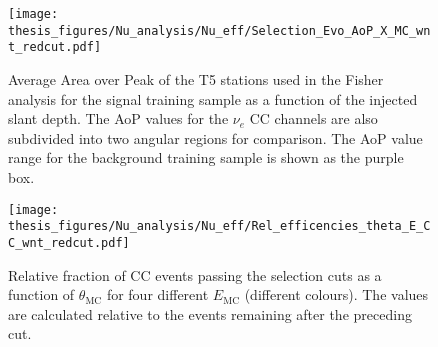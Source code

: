 \begin{figure}[t!]
  \centering
  \texttt{[image: thesis\_figures/Nu\_analysis/Nu\_eff/Selection\_Evo\_AoP\_X\_MC\_wnt\_redcut.pdf]}
  \caption{Average Area over Peak of the T5 stations used in the Fisher analysis for the signal training sample as a function of the injected slant depth. The AoP values for the $\nu_e$ CC channels are also subdivided into two angular regions for comparison. The AoP value range for the background training sample is shown as the purple box.}
  \label{fig:AoP_v_X}
\end{figure}

\begin{figure}[ht!]
  \centering
  \texttt{[image: thesis\_figures/Nu\_analysis/Nu\_eff/Rel\_efficencies\_theta\_E\_CC\_wnt\_redcut.pdf]}
  \caption{Relative fraction of CC events passing the selection cuts as a function of $\theta_{\text{MC}}$ for four different $E_{\text{MC}}$ (different colours). The values are calculated relative to the events remaining after the preceding cut.}
  \label{fig:Eff_v_theta_CC_E}
\end{figure}

